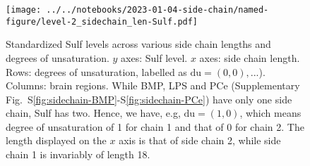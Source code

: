 \documentclass[letterpaper]{article}
\begin{document}
\begin{figure}[p]
	\texttt{[image: ../../notebooks/2023-01-04-side-chain/named-figure/level-2\_sidechain\_len-Sulf.pdf]}
	\caption[Sulf levels across various side chain lengths and degrees of unsaturation]{
		Standardized Sulf levels across various side chain lengths and degrees of unsaturation.
		$y$ axes: Sulf level. $x$ axes: side chain length. Rows: 
		degrees of unsaturation, labelled as $\mathrm{du} = (0,0), ...$). Columns:
		brain regions.
	While BMP, LPS and PCe
	(Supplementary Fig.~S\ref{fig:sidechain-BMP}-S\ref{fig:sidechain-PCe}) have only one side
	chain, Sulf has two.  Hence, we have, e.g, $\mathrm{du} = (1,0)$, which means
	degree of unsaturation of 1 for chain 1 and that of 0 for chain 2.  The
	length displayed on the $x$ axis is that of side chain 2, while side chain 1
	is invariably of length 18.
}
\label{fig:sidechain-Sulf}
\end{figure}
\end{document}
